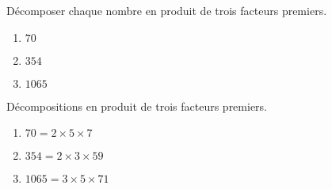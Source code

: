 \begin{exercice*}
    \label{N2exosBase013}
    Décomposer chaque nombre en produit de trois facteurs premiers.
    \begin{enumerate}
        \item $70$
        \item $354$
        \item $\num{1065}$
    \end{enumerate}

\end{exercice*}
\begin{corrige}
    Décompositions en produit de trois facteurs premiers.
    
    \begin{enumerate}
        \item $70=2\times 5\times 7$
        \item $354=2\times 3\times 59$
        \item $\num{1065}=3\times 5\times 71$
    \end{enumerate} 
\end{corrige}

